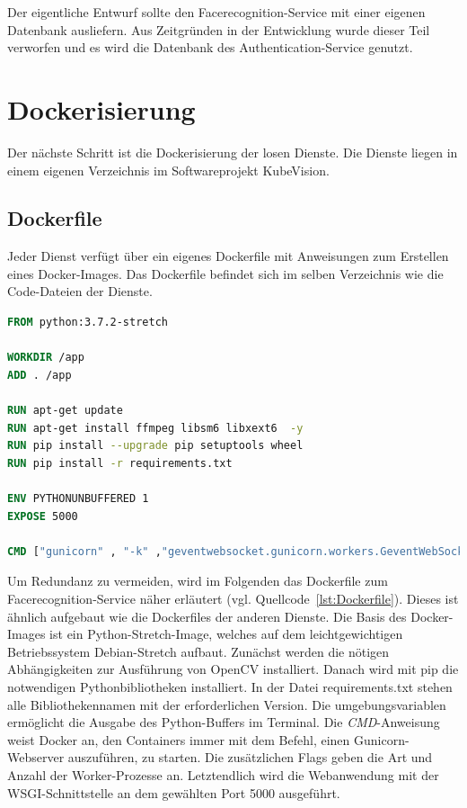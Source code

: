 Der eigentliche Entwurf sollte den Facerecognition-Service mit einer eigenen Datenbank ausliefern.
Aus Zeitgründen in der Entwicklung wurde dieser Teil verworfen und es wird die Datenbank des Authentication-Service genutzt.


\section{Dockerisierung}

Der nächste Schritt ist die Dockerisierung der losen Dienste.
Die Dienste liegen in einem eigenen Verzeichnis im Softwareprojekt KubeVision.

\subsection{Dockerfile}

Jeder Dienst verfügt über ein eigenes Dockerfile mit Anweisungen zum Erstellen eines Docker-Images.
Das Dockerfile befindet sich im selben Verzeichnis wie die Code-Dateien der Dienste.

\begin{lstlisting}[caption={Dockerfile},captionpos=b ,label={lst:Dockerfile},language=Dockerfile,float,floatplacement=H]
FROM python:3.7.2-stretch

WORKDIR /app
ADD . /app

RUN apt-get update
RUN apt-get install ffmpeg libsm6 libxext6  -y
RUN pip install --upgrade pip setuptools wheel
RUN pip install -r requirements.txt

ENV PYTHONUNBUFFERED 1
EXPOSE 5000

CMD ["gunicorn" , "-k" ,"geventwebsocket.gunicorn.workers.GeventWebSocketWorker", "-w", "3" , "--bind" , ":5000" , "run:app"]
\end{lstlisting}

Um Redundanz zu vermeiden, wird im Folgenden das Dockerfile zum Facerecognition-Service näher erläutert (vgl. Quellcode~\ref{lst:Dockerfile}).
Dieses ist ähnlich aufgebaut wie die Dockerfiles der anderen Dienste.
Die Basis des Docker-Images ist ein Python-Stretch-Image, welches auf dem leichtgewichtigen Betriebssystem Debian-Stretch aufbaut.
Zunächst werden die nötigen Abhängigkeiten zur Ausführung von OpenCV installiert.
Danach wird mit pip die notwendigen Pythonbibliotheken installiert.
In der Datei requirements.txt stehen alle Bibliothekennamen mit der erforderlichen Version.
Die umgebungsvariablen ermöglicht die Ausgabe des Python-Buffers im Terminal.
Die \textit{CMD}-Anweisung weist Docker an, den Containers immer mit dem Befehl, einen Gunicorn-Webserver auszuführen, zu starten.
Die zusätzlichen Flags geben die Art und Anzahl der Worker-Prozesse an.
Letztendlich wird die Webanwendung mit der WSGI-Schnittstelle an dem gewählten Port 5000 ausgeführt.

